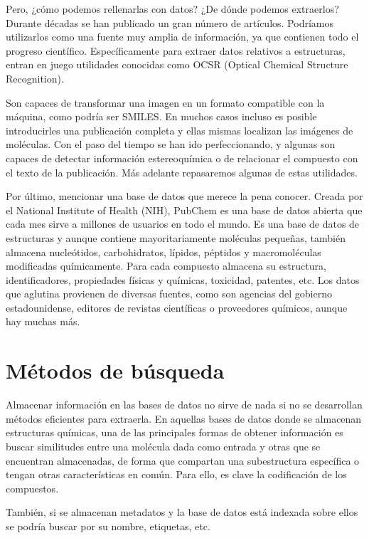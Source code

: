 Pero, ¿cómo podemos rellenarlas con datos? ¿De dónde podemos extraerlos? Durante décadas se han publicado un gran número de artículos. Podríamos utilizarlos como una fuente muy amplia de información, ya que contienen todo el progreso científico. Específicamente para extraer datos relativos a estructuras, entran en juego utilidades conocidas como OCSR (Optical Chemical Structure Recognition).

Son capaces de transformar una imagen en un formato compatible con la máquina, como podría ser SMILES. En muchos casos incluso es posible introducirles una publicación completa y ellas mismas localizan las imágenes de moléculas. Con el paso del tiempo se han ido perfeccionando, y algunas son capaces de detectar información estereoquímica o de relacionar el compuesto con el texto de la publicación. Más adelante repasaremos algunas de estas utilidades. 

Por último, mencionar una base de datos que merece la pena conocer. Creada por el National Institute of Health (NIH), PubChem es una base de datos abierta que cada mes sirve a millones de usuarios en todo el mundo. Es una base de datos de estructuras y aunque contiene mayoritariamente moléculas pequeñas, también almacena nucleótidos, carbohidratos, lípidos, péptidos y macromoléculas modificadas químicamente. Para cada compuesto almacena su estructura, identificadores, propiedades físicas y químicas, toxicidad, patentes, etc. Los datos que aglutina provienen de diversas fuentes, como son agencias del gobierno estadounidense, editores de revistas científicas o proveedores químicos, aunque hay muchas más. \cite{pubchem}

\section*{Métodos de búsqueda}
Almacenar información en las bases de datos no sirve de nada si no se desarrollan métodos eficientes para extraerla. En aquellas bases de datos donde se almacenan estructuras químicas, una de las principales formas de obtener información es buscar similitudes entre una molécula dada como entrada y otras que se encuentran almacenadas, de forma que compartan una subestructura específica o tengan otras características en común. Para ello, es clave la codificación de los compuestos.

También, si se almacenan metadatos y la base de datos está indexada sobre ellos se podría buscar por su nombre, etiquetas, etc. \cite{doi:10.1021/ci600234z}


